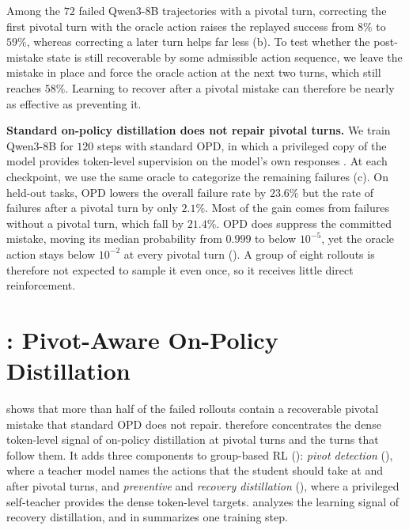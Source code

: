 \documentclass[10pt, logo, onecolumn, copyright]{nv}
\begin{document}
Among the $72$ failed Qwen3-8B trajectories with a pivotal turn, correcting the first pivotal turn with the oracle action raises the replayed success from $8\%$ to $59\%$, whereas correcting a later turn helps far less (b). To test whether the post-mistake state is still recoverable by some admissible action sequence, we leave the mistake in place and force the oracle action at the next two turns, which still reaches $58\%$. Learning to recover after a pivotal mistake can therefore be nearly as effective as preventing it.

\textbf{Standard on-policy distillation does not repair pivotal turns.}
We train Qwen3-8B for $120$ steps with standard OPD, in which a privileged copy of the model provides token-level supervision on the model's own responses \citep{zhao2026opsd}. At each checkpoint, we use the same oracle to categorize the remaining failures (c). On held-out tasks, OPD lowers the overall failure rate by $23.6\%$ but the rate of failures after a pivotal turn by only $2.1\%$. Most of the gain comes from failures without a pivotal turn, which fall by $21.4\%$. OPD does suppress the committed mistake, moving its median probability from $0.999$ to below $10^{-5}$, yet the oracle action stays below $10^{-2}$ at every pivotal turn (). A group of eight rollouts is therefore not expected to sample it even once, so it receives little direct reinforcement.


\section{\method{}: Pivot-Aware On-Policy Distillation}
\label{sec:method}

  shows that more than half of the failed rollouts contain a recoverable pivotal mistake that standard OPD does not repair. \method{} therefore concentrates the dense token-level signal of on-policy distillation at pivotal turns and the turns that follow them. It adds three components to group-based RL (): \emph{pivot detection} (), where a teacher model names the actions that the student should take at and after pivotal turns, and \emph{preventive} and \emph{recovery distillation} (), where a privileged self-teacher provides the dense token-level targets.  analyzes the learning signal of recovery distillation, and  in  summarizes one training step.
\end{document}
